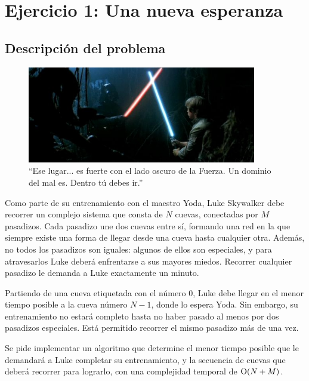 \section{Ejercicio 1: Una nueva esperanza}

    \subsection{Descripción del problema}

    \begin{figure}[ht]
        \begin{center}
            \includegraphics[width=10cm]{imagenes/una_nueva_esperanza.jpg}
            \caption*{``Ese lugar... es fuerte con el lado oscuro de la Fuerza. Un
            dominio del mal es. Dentro tú debes ir.''}
        \end{center}
    \end{figure}

    Como parte de su entrenamiento con el maestro Yoda, Luke Skywalker debe
    recorrer un complejo sistema que consta de $N$ cuevas, conectadas por $M$
    pasadizos. Cada pasadizo une dos cuevas entre sí, formando una red en la
    que siempre existe una forma de llegar desde una cueva hasta cualquier
    otra. Además, no todos los pasadizos son iguales: algunos de ellos son
    especiales, y para atravesarlos Luke deberá enfrentarse a sus mayores
    miedos. Recorrer cualquier pasadizo le demanda a Luke exactamente un
    minuto.

    Partiendo de una cueva etiquetada con el número $0$, Luke debe llegar en
    el menor tiempo posible a la cueva número $N-1$, donde lo espera Yoda.
    Sin embargo, su entrenamiento no estará completo hasta no haber pasado al
    menos por dos pasadizos especiales. Está permitido recorrer el mismo
    pasadizo más de una vez.

    Se pide implementar un algoritmo que determine el menor tiempo posible que
    le demandará a Luke completar su entrenamiento, y la secuencia de cuevas
    que deberá recorrer para lograrlo, con una complejidad temporal de
    $\operatorname{O}(N + M)$.

